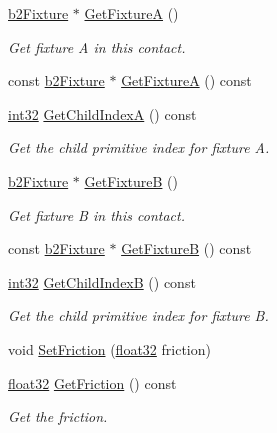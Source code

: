 \begin{DoxyCompactItemize}
\mbox{\hyperlink{classb2_fixture}{b2\+Fixture}} $\ast$ \mbox{\hyperlink{classb2_contact_a707a3a5a14c2cdd4c6eb7fc648d76037}{Get\+FixtureA}} ()
\begin{DoxyCompactList}\small\item\em Get fixture A in this contact. \end{DoxyCompactList}\item 
const \mbox{\hyperlink{classb2_fixture}{b2\+Fixture}} $\ast$ \mbox{\hyperlink{classb2_contact_ad3c9e8c69128efbe03af632c1acc7776}{Get\+FixtureA}} () const
\item 
\mbox{\hyperlink{b2_settings_8h_a43d43196463bde49cb067f5c20ab8481}{int32}} \mbox{\hyperlink{classb2_contact_aa0b0739e6615ba8d38e9b5bd8761dc31}{Get\+Child\+IndexA}} () const
\begin{DoxyCompactList}\small\item\em Get the child primitive index for fixture A. \end{DoxyCompactList}\item 
\mbox{\hyperlink{classb2_fixture}{b2\+Fixture}} $\ast$ \mbox{\hyperlink{classb2_contact_a68464fe587d7e6a1f52763e965bb7361}{Get\+FixtureB}} ()
\begin{DoxyCompactList}\small\item\em Get fixture B in this contact. \end{DoxyCompactList}\item 
const \mbox{\hyperlink{classb2_fixture}{b2\+Fixture}} $\ast$ \mbox{\hyperlink{classb2_contact_aa89780a20a2b7cd424c09adca9917546}{Get\+FixtureB}} () const
\item 
\mbox{\hyperlink{b2_settings_8h_a43d43196463bde49cb067f5c20ab8481}{int32}} \mbox{\hyperlink{classb2_contact_aab201068e7f2cc31c69b1f5c8471d672}{Get\+Child\+IndexB}} () const
\begin{DoxyCompactList}\small\item\em Get the child primitive index for fixture B. \end{DoxyCompactList}\item 
void \mbox{\hyperlink{classb2_contact_a5e8fbb6bb2966ac84272bb0ea9d2e4c7}{Set\+Friction}} (\mbox{\hyperlink{b2_settings_8h_aacdc525d6f7bddb3ae95d5c311bd06a1}{float32}} friction)
\item 
\mbox{\hyperlink{b2_settings_8h_aacdc525d6f7bddb3ae95d5c311bd06a1}{float32}} \mbox{\hyperlink{classb2_contact_a7650ec27931c82f3914f37fdeb267b02}{Get\+Friction}} () const
\begin{DoxyCompactList}\small\item\em Get the friction. \end{DoxyCompactList}\item 

\end{DoxyCompactItemize}
